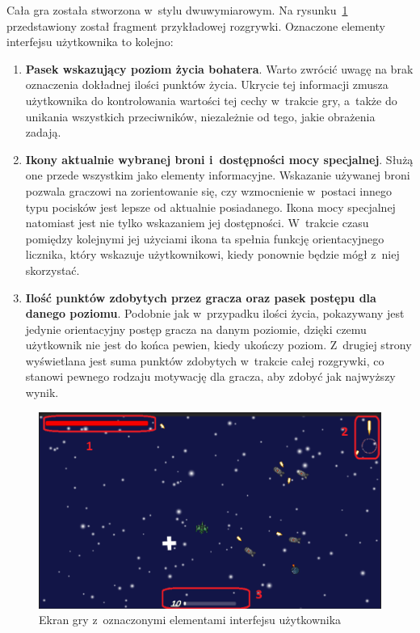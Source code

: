 Cała gra została stworzona w~stylu dwuwymiarowym. Na rysunku~\ref{fig:ui} przedstawiony został fragment przykładowej rozgrywki. Oznaczone elementy interfejsu użytkownika to kolejno:
\begin{enumerate}
	\item \textbf{Pasek wskazujący poziom życia bohatera}. Warto zwrócić uwagę na brak oznaczenia dokładnej ilości punktów życia. Ukrycie tej informacji zmusza użytkownika do kontrolowania wartości tej cechy w~trakcie gry, a~także do unikania wszystkich przeciwników, niezależnie od tego, jakie obrażenia zadają.
	\item \textbf{Ikony aktualnie wybranej broni i~dostępności mocy specjalnej}. Służą one przede wszystkim jako elementy informacyjne. Wskazanie używanej broni pozwala graczowi na zorientowanie się, czy wzmocnienie w~postaci innego typu pocisków jest lepsze od aktualnie posiadanego. Ikona mocy specjalnej natomiast jest nie tylko wskazaniem jej dostępności. W~trakcie czasu pomiędzy kolejnymi jej użyciami ikona ta spełnia funkcję orientacyjnego licznika, który wskazuje użytkownikowi, kiedy ponownie będzie mógł z~niej skorzystać.
	\item \textbf{Ilość punktów zdobytych przez gracza oraz pasek postępu dla danego poziomu}. Podobnie jak w~przypadku ilości życia, pokazywany jest jedynie orientacyjny postęp gracza na danym poziomie, dzięki czemu użytkownik nie jest do końca pewien, kiedy ukończy poziom. Z~drugiej strony wyświetlana jest suma punktów zdobytych w~trakcie całej rozgrywki, co stanowi pewnego rodzaju motywację dla gracza, aby zdobyć jak najwyższy wynik.
\end{enumerate}

\begin{figure}
	\centering
	\includegraphics[width=0.7\linewidth]{images/ui.png}
	\caption{Ekran gry z~oznaczonymi elementami interfejsu użytkownika}
	\label{fig:ui}
\end{figure}

